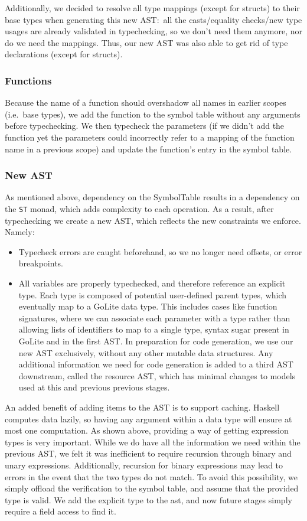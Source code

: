 \documentclass[11pt]{article}
\begin{document}
Additionally, we decided to resolve all type mappings (except for
structs) to their base types when generating this new AST:~all the
casts/equality checks/new type usages are already validated in
typechecking, so we don't need them anymore, nor do we need the
mappings. Thus, our new AST was also able to get rid of type
declarations (except for structs).
\subsubsection{Functions}
Because the name of a function should overshadow all names in earlier
scopes (i.e.\ base types), we add the
function to the symbol table without any arguments before
typechecking. We then typecheck the parameters (if we didn't add the
function yet the parameters could incorrectly refer to a mapping of
the function name in a previous scope) and update the function's entry
in the symbol table.
\subsubsection{New AST}
As mentioned above, dependency on the SymbolTable results in a
dependency on the \texttt{ST} monad, which adds complexity to each
operation.  As a result, after typechecking we create a
new AST, which reflects the new constraints we enforce.  Namely:
\begin{itemize}
\item Typecheck errors are caught beforehand, so we no longer need
  offsets, or error breakpoints.
\item All variables are properly typechecked, and therefore
  reference an explicit type. Each type is composed of potential user-defined
  parent types, which eventually map to a GoLite data type.
  This includes cases like function signatures,
  where we can associate each parameter with a type rather than
  allowing lists of identifiers to map to a single type, syntax sugar
  present in GoLite and in the first AST.  In
  preparation for code generation, we use our new AST exclusively,
  without any other mutable data structures. Any additional
  information we need for code generation is added to a third AST downstream,
  called the resource AST, which has minimal changes to models used at this and
  previous previous stages.
\end{itemize}

An added benefit of adding items to the AST is to support caching.
Haskell computes data lazily, so having any argument within a
data type will ensure at most one computation.
As shown above, providing a way of getting expression types is very important. While we do have all the information we need within the previous AST,
we felt it was inefficient to require recursion through binary and unary expressions.
Additionally, recursion for binary expressions may lead to errors in the
event that the two types do not match. To avoid this possibility,
we simply offload the verification to the symbol table, and assume that the provided type is valid.
We add the explicit type to the ast, and now future stages simply require
a field access to find it.
\end{document}
